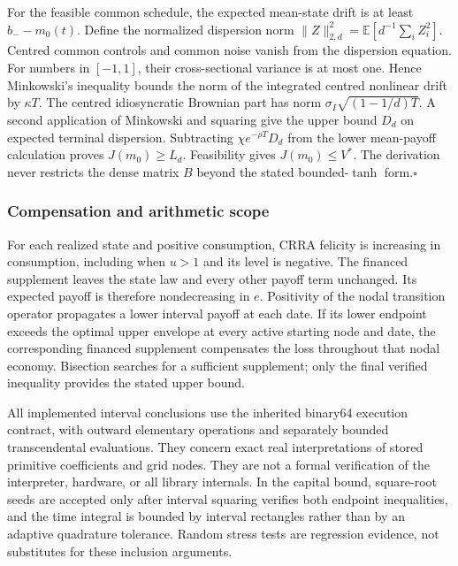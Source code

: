 For the feasible common schedule, the expected mean-state drift is at least $b_--m_0(t)$. Define the normalized dispersion norm $\|Z\|_{2,d}^2=\mathbb E[d^{-1}\sum_i Z_i^2]$. Centred common controls and common noise vanish from the dispersion equation. For numbers in $[-1,1]$, their cross-sectional variance is at most one. Hence Minkowski's inequality bounds the norm of the integrated centred nonlinear drift by $\kappa T$. The centred idiosyncratic Brownian part has norm $\sigma_I\sqrt{(1-1/d)T}$. A second application of Minkowski and squaring give the upper bound $D_d$ on expected terminal dispersion. Subtracting $\chi e^{-\rho T}D_d$ from the lower mean-payoff calculation proves $J(m_0)\geq L_d$. Feasibility gives $J(m_0)\leq V^*$. The derivation never restricts the dense matrix $B$ beyond the stated bounded-$\tanh$ form.\hfill$\square$

\subsubsection{Compensation and arithmetic scope}
For each realized state and positive consumption, CRRA felicity is increasing in consumption, including when $u>1$ and its level is negative. The financed supplement leaves the state law and every other payoff term unchanged. Its expected payoff is therefore nondecreasing in $e$. Positivity of the nodal transition operator propagates a lower interval payoff at each date. If its lower endpoint exceeds the optimal upper envelope at every active starting node and date, the corresponding financed supplement compensates the loss throughout that nodal economy. Bisection searches for a sufficient supplement; only the final verified inequality provides the stated upper bound.

All implemented interval conclusions use the inherited binary64 execution contract, with outward elementary operations and separately bounded transcendental evaluations. They concern exact real interpretations of stored primitive coefficients and grid nodes. They are not a formal verification of the interpreter, hardware, or all library internals. In the capital bound, square-root seeds are accepted only after interval squaring verifies both endpoint inequalities, and the time integral is bounded by interval rectangles rather than by an adaptive quadrature tolerance. Random stress tests are regression evidence, not substitutes for these inclusion arguments.
